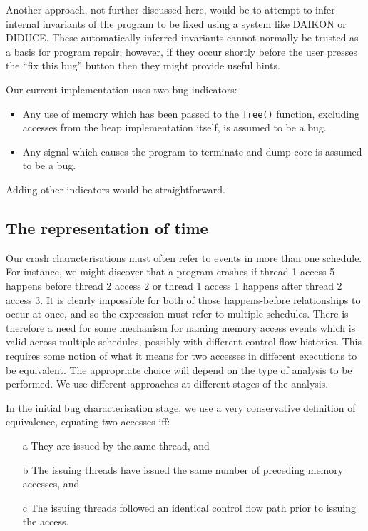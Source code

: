 \documentclass[10pt,a4paper]{report}
\begin{document}
Another approach, not further discussed here, would be to attempt to
infer internal invariants of the program to be fixed using a system
like DAIKON\needCite{} or DIDUCE\needCite{}.  These automatically
inferred invariants cannot normally be trusted as a basis for program
repair; however, if they occur shortly before the user presses the
``fix this bug'' button then they might provide useful hints.

Our current implementation uses two bug indicators:

\begin{itemize}
\item Any use of memory which has been passed to the \verb|free()|
  function, excluding accesses from the heap implementation itself, is
  assumed to be a bug.
\item Any signal which causes the program to terminate and dump core
  is assumed to be a bug.
\end{itemize}

Adding other indicators would be straightforward.

\subsection{The representation of time}

Our crash characterisations must often refer to events in more than
one schedule.  For instance, we might discover that a program crashes
if thread 1 access 5 happens before thread 2 access 2 or thread 1
access 1 happens after thread 2 access 3.  It is clearly impossible
for both of those happens-before relationships to occur at once, and
so the expression must refer to multiple schedules.  There is
therefore a need for some mechanism for naming memory access events
which is valid across multiple schedules, possibly with different
control flow histories.  This requires some notion of what it means
for two accesses in different executions to be equivalent.  The
appropriate choice will depend on the type of analysis to be
performed.  We use different approaches at different stages of the
analysis.

In the initial bug characterisation stage, we use a very conservative
definition of equivalence, equating two accesses iff:

\begin{itemize}
\item[a] They are issued by the same thread, and
\item[b] The issuing threads have issued the same number of preceding
  memory accesses, and
\item[c] The issuing threads followed an identical control flow path
  prior to issuing the access.
\end{itemize}
\end{document}
